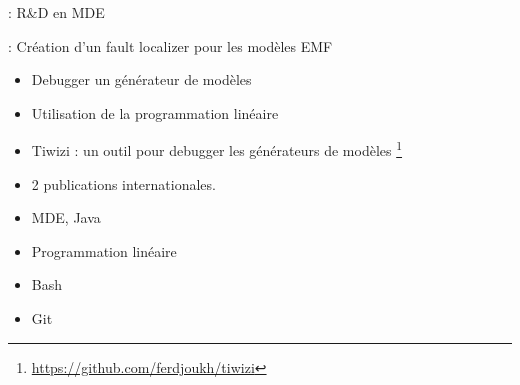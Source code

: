 
 : R\&D en MDE

 : Création d’un fault localizer pour les modèles EMF

\bigskip


\begin{itemize}
\item Debugger un générateur de modèles
\item Utilisation de la programmation linéaire
\end{itemize} 


\begin{itemize}
\item Tiwizi : un outil pour debugger les générateurs de modèles \footnote{\url{https://github.com/ferdjoukh/tiwizi}}
\item 2 publications internationales.
\end{itemize} 


\begin{itemize}
\item MDE, Java
\item Programmation linéaire
\item Bash
\item Git
\end{itemize} 